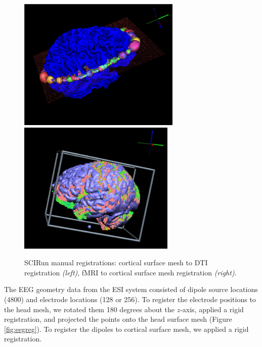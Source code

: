 \begin{figure}[H]
\begin{center}
\includegraphics[height = 2.5in]{Figures/DTI_reg}
\includegraphics[height = 2.5in]{Figures/fmri_reg}
\caption{SCIRun manual registrations: cortical surface mesh to DTI registration \textit{(left)}, fMRI to cortical surface mesh registration \textit{(right)}.}
\label{fig:dtireg}
\end{center}
\end{figure}

The EEG geometry data from the ESI system consisted of dipole source locations (4800) and electrode locations (128 or 256). To register the electrode positions to the head mesh, we rotated them 180 degrees about the $z$-axis, applied a rigid registration, and projected the points onto the head surface mesh (Figure \ref{fig:eegreg}). To register the dipoles to cortical surface mesh, we applied a rigid registration.


